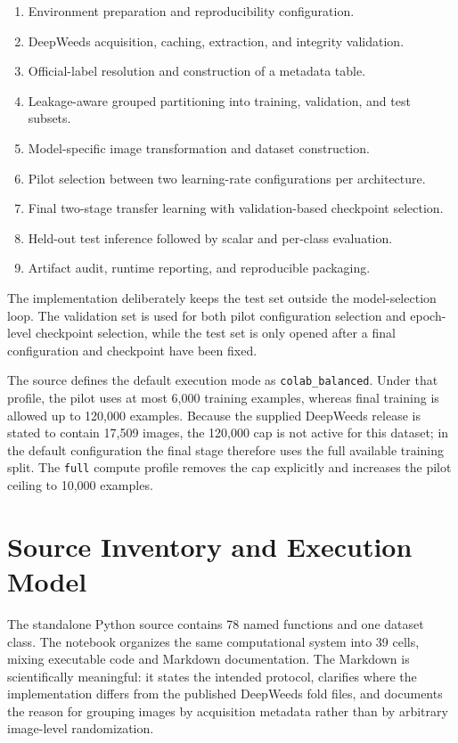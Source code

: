 \documentclass[11pt,a4paper]{article}
\begin{document}
\begin{enumerate}
\item Environment preparation and reproducibility configuration.
\item DeepWeeds acquisition, caching, extraction, and integrity validation.
\item Official-label resolution and construction of a metadata table.
\item Leakage-aware grouped partitioning into training, validation, and test subsets.
\item Model-specific image transformation and dataset construction.
\item Pilot selection between two learning-rate configurations per architecture.
\item Final two-stage transfer learning with validation-based checkpoint selection.
\item Held-out test inference followed by scalar and per-class evaluation.
\item Artifact audit, runtime reporting, and reproducible packaging.
\end{enumerate}

The implementation deliberately keeps the test set outside the model-selection loop. The validation set is used for both pilot configuration selection and epoch-level checkpoint selection, while the test set is only opened after a final configuration and checkpoint have been fixed.

The source defines the default execution mode as \texttt{colab\_balanced}. Under that profile, the pilot uses at most 6,000 training examples, whereas final training is allowed up to 120,000 examples. Because the supplied DeepWeeds release is stated to contain 17,509 images, the 120,000 cap is not active for this dataset; in the default configuration the final stage therefore uses the full available training split. The \texttt{full} compute profile removes the cap explicitly and increases the pilot ceiling to 10,000 examples.

\section{Source Inventory and Execution Model}
The standalone Python source contains 78 named functions and one dataset class. The notebook organizes the same computational system into 39 cells, mixing executable code and Markdown documentation. The Markdown is scientifically meaningful: it states the intended protocol, clarifies where the implementation differs from the published DeepWeeds fold files, and documents the reason for grouping images by acquisition metadata rather than by arbitrary image-level randomization.
\end{document}
